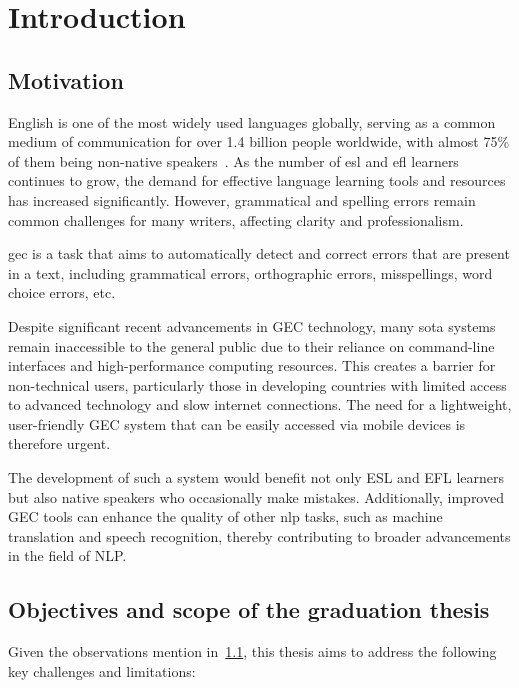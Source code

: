 \chapter{Introduction}

\section{Motivation}
\label{section:motivation}

English is one of the most widely used languages globally, serving as a common medium of communication for over 1.4 billion people worldwide, with almost 75\% of them being non-native speakers~\citep{eberhard2015ethnologue}.
As the number of \acrfull{esl} and \acrfull{efl} learners continues to grow, the demand for effective language learning tools and resources has increased significantly.
However, grammatical and spelling errors remain common challenges for many writers, affecting clarity and professionalism.

\acrfull{gec} is a task that aims to automatically detect and correct errors that are present in a text, including grammatical errors, orthographic errors, misspellings, word choice errors, etc. \citep{ng-etal-2014-conll}

Despite significant recent advancements in GEC technology, many \acrfull{sota} systems remain inaccessible to the general public due to their reliance on command-line interfaces and high-performance computing resources.
This creates a barrier for non-technical users, particularly those in developing countries with limited access to advanced technology and slow internet connections.
The need for a lightweight, user-friendly GEC system that can be easily accessed via mobile devices is therefore urgent.

The development of such a system would benefit not only ESL and EFL learners but also native speakers who occasionally make mistakes.
Additionally, improved GEC tools can enhance the quality of other \acrfull{nlp} tasks, such as machine translation and speech recognition, thereby contributing to broader advancements in the field of NLP.

\section{Objectives and scope of the graduation thesis}
\label{section:objective}
Given the observations mention in~\ref{section:motivation}, this thesis aims to address the following key challenges and limitations:


